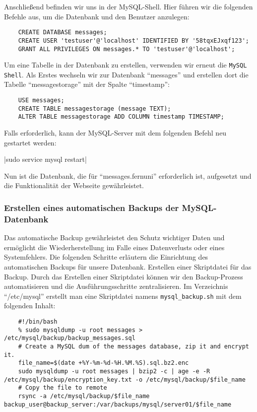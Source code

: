 Anschließend befinden wir uns in der MySQL-Shell. Hier führen wir die folgenden Befehle aus, um die Datenbank und den Benutzer anzulegen:

\begin{verbatim}
    CREATE DATABASE messages;
    CREATE USER 'testuser'@'localhost' IDENTIFIED BY '58tqxEJxqf123';
    GRANT ALL PRIVILEGES ON messages.* TO 'testuser'@'localhost';
\end{verbatim}

Um eine Tabelle in der Datenbank zu erstellen, verwenden wir erneut die \verb+MySQL Shell+.
Als Erstes wechseln wir zur Datenbank \enquote{messages} und erstellen dort die Tabelle \enquote{messagestorage} mit der Spalte \enquote{timestamp}:

\begin{verbatim}
    USE messages;
    CREATE TABLE messagestorage (message TEXT);
    ALTER TABLE messagestorage ADD COLUMN timestamp TIMESTAMP;
\end{verbatim}

Falls erforderlich, kann der MySQL-Server mit dem folgenden Befehl neu gestartet werden:

|sudo service mysql restart|

Nun ist die Datenbank, die für \enquote{messages.fernuni} erforderlich ist, aufgesetzt und die Funktionalität der Webseite gewährleistet.

\subsubsection*{Erstellen eines automatischen Backups der MySQL-Datenbank}

Das automatische Backup gewährleistet den Schutz wichtiger Daten und ermöglicht die Wiederherstellung im Falle eines Datenverlusts oder eines Systemfehlers. Die folgenden Schritte erläutern die Einrichtung des automatischen Backups für unsere Datenbank.
Erstellen einer Skriptdatei für das Backup.
Durch das Erstellen einer Skriptdatei können wir den Backup-Prozess automatisieren und die Ausführungsschritte zentralisieren.
Im Verzeichnis \enquote{/etc/mysql} erstellt man eine Skriptdatei namens \verb+mysql_backup.sh+ mit dem folgenden Inhalt:

\begin{verbatim}
    #!/bin/bash
    % sudo mysqldump -u root messages > /etc/mysql/backup/backup_messages.sql
    # Create a MySQL dum of the messages database, zip it and encrypt it.
    file_name=$(date +%Y-%m-%d-%H.%M.%S).sql.bz2.enc
    sudo mysqldump -u root messages | bzip2 -c | age -e -R /etc/mysql/backup/encryption_key.txt -o /etc/mysql/backup/$file_name
    # Copy the file to remote
    rsync -a /etc/mysql/backup/$file_name backup_user@backup_server:/var/backups/mysql/server01/$file_name
\end{verbatim}

